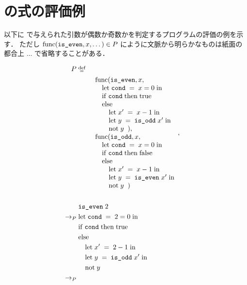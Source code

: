 
\section{\Yil の式の評価例}
\label{sec:lang:semantics:example}

\par 以下に \Yil で与えられた引数が偶数か奇数かを判定するプログラムの評価の例を示す．
ただし $\Func{\code{is\_even}}{x}{\dots} \in P$ にように文脈から明らかなものは紙面の都合上 $\dots$ で省略することがある．

\begin{align*}
  P \; &\defeq& \; \\
  &\quad\quad \begin{array}{l}
    \Func
      {\code{is\_even}}{x}
      {\\ \quad \Let
        {\; \code{cond} \;}{\; x=0 \;}
        {\\ \quad \If{\; \code{cond} \;}{\; \true \\ \quad}
        {\\ \quad\quad \Let{\; x' \;}{\; x-1 \;}
        {\\ \quad\quad \Let{\; y \;}{\; \App{\code{is\_odd}}{x'} \;}
        {\\ \quad\quad \App{\mathrm{not}}{y} \;}}} \;}
      }, \\
    \Func
      {\code{is\_odd}}{x}
      {\\ \quad \Let
        {\; \code{cond} \;}{\; x = 0 \;}
        {\\ \quad \If{\; \code{cond} \;}{\; \false \\ \quad}
        {\\ \quad\quad \Let{\; x' \;}{\; x-1 \;}
        {\\ \quad\quad \Let{\; y \;}{\; \App{\code{is\_even}}{x'} \;}
        {\\ \quad\quad \App{\mathrm{not}}{y} \;}}} \;}
      }
  \end{array}, \\\\ &
    \Reduce{P}{\App{\code{is\_even}}{2} \\}{
    \Reduce{P}{
      & \Let{\; \code{cond} \;}{\; 2 = 0 \;}{ \\
      & \If{\; \code{cond} \;}{\; \true \\ &}{\\
      & \quad \Let{\; x' \;}{\; 2 - 1 \;}{\\
      & \quad \Let{\; y \;}{\App{\; \code{is\_odd}}{x' \;}}{\\
      & \quad \App{\mathrm{not}}{y}}}}} \\ }{
}}
\end{align*}
